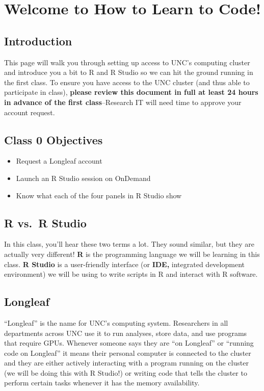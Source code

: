 \documentclass[
  letterpaper,
  DIV=11,
  numbers=noendperiod]{scrreprt}
\begin{document}

\chapter{Welcome to How to Learn to
Code!}\label{welcome-to-how-to-learn-to-code}

\section{Introduction}\label{introduction}

This page will walk you through setting up access to UNC's computing
cluster and introduce you a bit to R and R Studio so we can hit the
ground running in the first class. To ensure you have access to the UNC
cluster (and thus able to participate in class), \textbf{please review
this document in full at least 24 hours in advance of the first
class}--Research IT will need time to approve your account request.

\section{Class 0 Objectives}\label{class-0-objectives}

\begin{itemize}
\item
  Request a Longleaf account
\item
  Launch an R Studio session on OnDemand
\item
  Know what each of the four panels in R Studio show
\end{itemize}

\section{R vs.~R Studio}\label{r-vs.-r-studio}

In this class, you'll hear these two terms a lot. They sound similar,
but they are actually very different! \textbf{R} is the programming
language we will be learning in this class. \textbf{R Studio} is a
user-friendly interface (or \textbf{IDE,} integrated development
environment) we will be using to write scripts in R and interact with R
software.

\section{Longleaf}\label{longleaf}

``Longleaf'' is the name for UNC's computing system. Researchers in all
departments across UNC use it to run analyses, store data, and use
programs that require GPUs. Whenever someone says they are ``on
Longleaf'' or ``running code on Longleaf'' it means their personal
computer is connected to the cluster and they are either actively
interacting with a program running on the cluster (we will be doing this
with R Studio!) or writing code that tells the cluster to perform
certain tasks whenever it has the memory availability.
\end{document}

